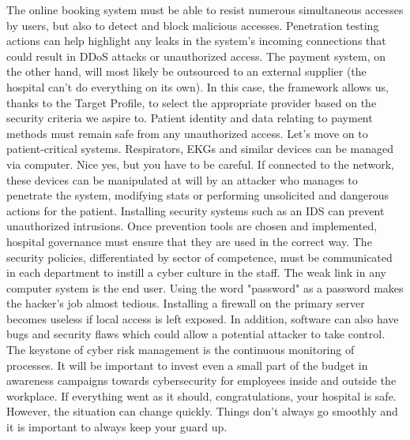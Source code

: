 The online booking system must be able to resist numerous simultaneous accesses by users, but also to detect and block malicious accesses. Penetration testing actions can help highlight any leaks in the system's incoming connections that could result in DDoS attacks or unauthorized access. The payment system, on the other hand, will most likely be outsourced to an external supplier (the hospital can't do everything on its own). In this case, the framework allows us, thanks to the Target Profile, to select the appropriate provider based on the security criteria we aspire to. Patient identity and data relating to payment methods must remain safe from any unauthorized access.\newline
Let's move on to patient-critical systems. Respirators, EKGs and similar devices can be managed via computer. Nice yes, but you have to be careful. If connected to the network, these devices can be manipulated at will by an attacker who manages to penetrate the system, modifying stats or performing unsolicited and dangerous actions for the patient. Installing security systems such as an IDS can prevent unauthorized intrusions.\vspace{0.5cm}\newline
Once prevention tools are chosen and implemented, hospital governance must ensure that they are used in the correct way. The security policies, differentiated by sector of competence, must be communicated in each department to instill a cyber culture in the staff. The weak link in any computer system is the end user. Using the word "password" as a password makes the hacker's job almost tedious. Installing a firewall on the primary server becomes useless if local access is left exposed. In addition, software can also have bugs and security flaws which could allow a potential attacker to take control. The keystone of cyber risk management is the continuous monitoring of processes. It will be important to invest even a small part of the budget in awareness campaigns towards cybersecurity for employees inside and outside the workplace. If everything went as it should, congratulations, your hospital is safe. However, the situation can change quickly. Things don't always go smoothly and it is important to always keep your guard up. 
